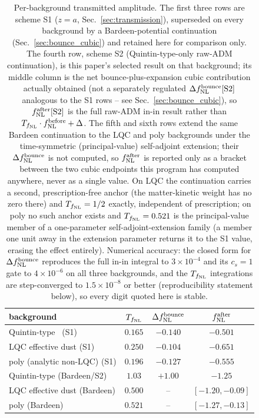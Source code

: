 \documentclass[aps,prd,twocolumn,superscriptaddress,nofootinbib,longbibliography]{revtex4-2}
\newcommand{\fnl}{f_{\rm NL}}
\begin{document}
\begin{table}[h]
\caption{\label{tab:s1_after}Per-background transmitted amplitude. The
first three rows are scheme S1 ($z=a$, Sec.~\ref{sec:transmission}),
superseded on every background by a Bardeen-potential continuation
(Sec.~\ref{sec:bounce_cubic}) and retained here for comparison only. The
fourth row, scheme S2 (Quintin-type-only raw-ADM continuation), is this
paper's selected result on that background; its middle column is the net
bounce-plus-expansion cubic contribution actually obtained (not a
separately regulated $\Delta\fnl^{\rm bounce}[{\rm S2}]$ analogous to the
S1 rows -- see Sec.~\ref{sec:bounce_cubic}), so $\fnl^{\rm after}[{\rm
S2}]$ is the full raw-ADM in-in result rather than
$T_{\fnl}\cdot\fnl^{\rm before}+\Delta$. The fifth and sixth rows extend
the same Bardeen continuation to the LQC and poly backgrounds under the
time-symmetric (principal-value) self-adjoint extension; their
$\Delta\fnl^{\rm bounce}$ is not computed, so $\fnl^{\rm after}$ is
reported only as a bracket between the two cubic endpoints this program
has computed anywhere, never as a single value. On LQC the continuation
carries a second, prescription-free anchor (the matter-kinetic weight has
no zero there) and $T_{\fnl}=1/2$ exactly, independent of prescription;
on poly no such anchor exists and $T_{\fnl}=0.521$ is the
principal-value member of a one-parameter self-adjoint-extension family
(a member one unit away in the extension parameter returns it to the S1
value, erasing the effect entirely). Numerical accuracy: the closed form
for $\Delta\fnl^{\rm bounce}$ reproduces the full in-in integral to
$3\times10^{-4}$ and its $c_s=1$ gate to $4\times10^{-6}$ on all three
backgrounds, and the $T_{\fnl}$ integrations are step-converged to
$1.5\times10^{-8}$ or better (reproducibility statement below), so every
digit quoted here is stable.}
\scriptsize
\begin{tabular}{lccc}
\hline\hline
background & $T_{\fnl}$ & $\Delta\fnl^{\rm bounce}$ & $\fnl^{\rm after}$ \\
\hline
Quintin-type~\cite{Quintin2015} (S1) & $0.165$ & $-0.140$ & $-0.501$ \\
LQC effective dust (S1) & $0.250$ & $-0.104$ & $-0.651$ \\
poly (analytic non-LQC) (S1) & $0.196$ & $-0.127$ & $-0.555$ \\
Quintin-type (Bardeen/S2) & $1.03$ & $+1.00$ & $-1.25$ \\
LQC effective dust (Bardeen) & $0.500$ & -- & $[-1.20,-0.09]$ \\
poly (Bardeen) & $0.521$ & -- & $[-1.27,-0.13]$ \\
\hline\hline
\end{tabular}
\end{table}
\end{document}
